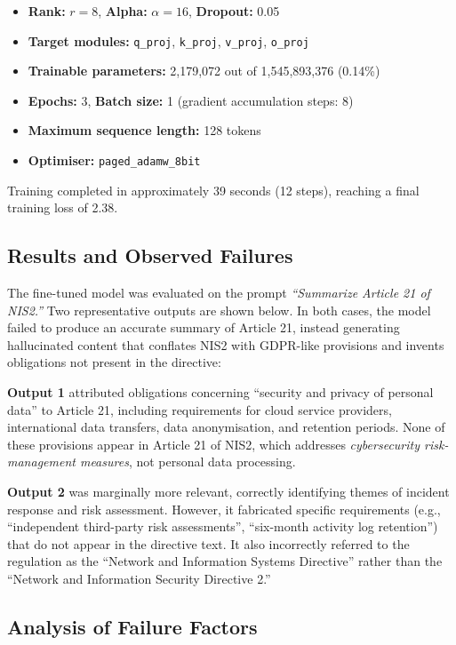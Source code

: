 \documentclass[]{UCD_CS_FYP_Report}
\begin{document}
\begin{itemize}
    \item \textbf{Rank:} $r = 8$, \textbf{Alpha:} $\alpha = 16$, \textbf{Dropout:} 0.05
    \item \textbf{Target modules:} \texttt{q\_proj}, \texttt{k\_proj}, \texttt{v\_proj}, \texttt{o\_proj}
    \item \textbf{Trainable parameters:} 2,179,072 out of 1,545,893,376 (0.14\%)
    \item \textbf{Epochs:} 3, \textbf{Batch size:} 1 (gradient accumulation steps: 8)
    \item \textbf{Maximum sequence length:} 128 tokens
    \item \textbf{Optimiser:} \texttt{paged\_adamw\_8bit}
\end{itemize}

Training completed in approximately 39 seconds (12 steps), reaching a final training loss of 2.38.

\subsection{Results and Observed Failures}

The fine-tuned model was evaluated on the prompt \textit{``Summarize Article 21 of NIS2.''} Two representative outputs are shown below. In both cases, the model failed to produce an accurate summary of Article 21, instead generating hallucinated content that conflates NIS2 with GDPR-like provisions and invents obligations not present in the directive:

\textbf{Output 1} attributed obligations concerning ``security and privacy of personal data'' to Article 21, including requirements for cloud service providers, international data transfers, data anonymisation, and retention periods. None of these provisions appear in Article 21 of NIS2, which addresses \textit{cybersecurity risk-management measures}, not personal data processing.

\textbf{Output 2} was marginally more relevant, correctly identifying themes of incident response and risk assessment. However, it fabricated specific requirements (e.g., ``independent third-party risk assessments'', ``six-month activity log retention'') that do not appear in the directive text. It also incorrectly referred to the regulation as the ``Network and Information Systems Directive'' rather than the ``Network and Information Security Directive 2.''

\subsection{Analysis of Failure Factors}
\end{document}
